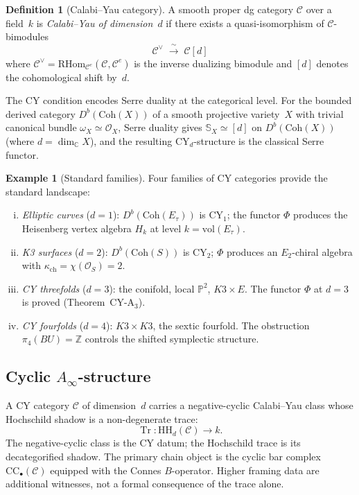 \documentclass[11pt]{article}
\theoremstyle{plain}
\theoremstyle{definition}
\newtheorem{definition}[theorem]{Definition}
\newtheorem{example}[theorem]{Example}
\theoremstyle{remark}
\newcommand{\cC}{\mathcal{C}}
\newcommand{\cO}{\mathcal{O}}
\newcommand{\bC}{\mathbb{C}}
\newcommand{\bP}{\mathbb{P}}
\newcommand{\bS}{\mathbb{S}}
\newcommand{\bZ}{\mathbb{Z}}
\newcommand{\Ainf}{A_\infty}
\newcommand{\Etwo}{E_2}
\newcommand{\Tr}{\operatorname{Tr}}
\newcommand{\HH}{\mathrm{HH}}
\newcommand{\CC}{\mathrm{CC}}
\newcommand{\CY}{\mathrm{CY}}
\newcommand{\Coh}{\mathrm{Coh}}
\begin{document}
\begin{definition}[Calabi--Yau category]
\label{def:v3-st-cy-category}
A smooth proper dg category $\cC$ over a field~$k$ is
\emph{Calabi--Yau of dimension~$d$} if there exists a
quasi-isomorphism of $\cC$-bimodules
\[
 \cC^\vee \;\xrightarrow{\;\sim\;}\; \cC[d]
\]
where $\cC^\vee = \mathrm{RHom}_{\cC^e}(\cC, \cC^e)$ is the
inverse dualizing bimodule and $[d]$ denotes the cohomological
shift by~$d$.
\end{definition}

The CY condition encodes Serre duality at the categorical level.
For the bounded derived category $D^b(\Coh(X))$ of a smooth
projective variety~$X$ with trivial canonical bundle
$\omega_X \simeq \cO_X$, Serre duality gives
$\bS_X \simeq [d]$ on $D^b(\Coh(X))$ (where $d = \dim_\bC X$),
and the resulting $\CY_d$-structure is the classical Serre
functor.

\begin{example}[Standard families]
\label{ex:v3-st-cy-families}
Four families of CY categories provide the standard landscape:
\begin{enumerate}[(i)]
 \item \emph{Elliptic curves} ($d = 1$): $D^b(\Coh(E_\tau))$ is
 $\CY_1$; the functor $\Phi$ produces the Heisenberg vertex
 algebra $H_k$ at level $k = \mathrm{vol}(E_\tau)$.
 \item \emph{K3 surfaces} ($d = 2$): $D^b(\Coh(S))$ is $\CY_2$;
 $\Phi$ produces an $\Etwo$-chiral algebra with
 $\kappa_{\mathrm{ch}} = \chi(\cO_S) = 2$.
 \item \emph{CY threefolds} ($d = 3$): the conifold, local $\bP^2$,
 $K3 \times E$.  The functor $\Phi$ at $d = 3$ is proved
 (Theorem~CY-A$_3$).
 \item \emph{CY fourfolds} ($d = 4$): $K3 \times K3$, the sextic
 fourfold.  The obstruction $\pi_4(BU) = \bZ$ controls the
 shifted symplectic structure.
\end{enumerate}
\end{example}

\subsection{Cyclic $\Ainf$-structure}

A CY category $\cC$ of dimension~$d$ carries a negative-cyclic
Calabi--Yau class whose Hochschild shadow is a non-degenerate trace:
\[
 \Tr \colon \HH_d(\cC) \longrightarrow k.
\]
The negative-cyclic class is the CY datum; the Hochschild trace is
its decategorified shadow.  The primary chain object is the cyclic
bar complex $\CC_\bullet(\cC)$ equipped with the Connes
$B$-operator.  Higher framing data are additional witnesses, not a
formal consequence of the trace alone.
\end{document}
